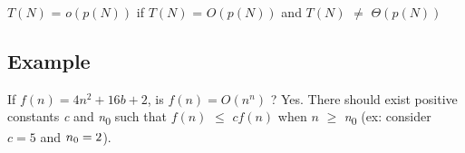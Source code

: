 \documentclass[letterpaper, 10pt,DIV=13]{scrartcl}
\numberwithin{equation}{section} %
\numberwithin{figure}{section} %
\numberwithin{table}{section} %
\begin{document}
$T(N)$ =  $o(p(N))$ if $T(N)$ =  $O(p(N))$ and $T(N)$  $\neq$  $\Theta(p(N))$

\subsection*{Example}

If $f(n) = 4n^{2} + 16b + 2$,  is $f(n) = O(n^{n})$ ? Yes. There should exist positive constants \textit{c} and \textit{n}\textsubscript{0} such that $f(n)$ $\leq$ $cf(n)$ when $n$ $\geq$ \textit{n}\textsubscript{0} (ex: consider $c = 5$ and $n\textsubscript{0} = 2$). \\

\end{document}
